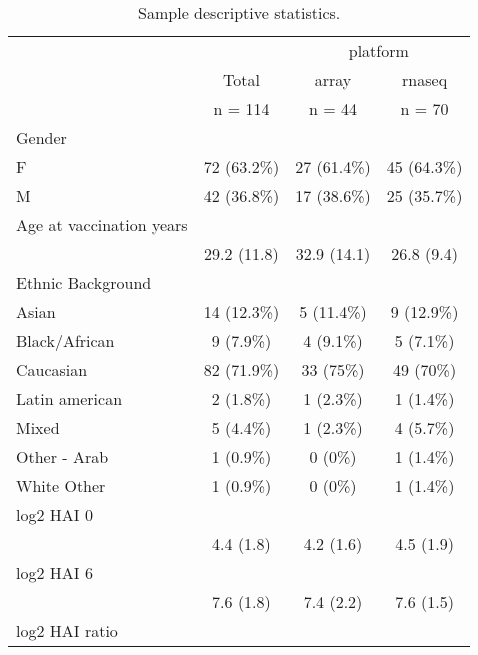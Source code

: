 \begin{table}[ ht ] 
 \centering 
 \caption{Sample descriptive statistics.}\label{tab:hird_table1}
 \begin{tabular}{ l c c c }
 \toprule
  &   &  \multicolumn{ 2 }{c}{ platform }\\ 
   & Total & array & rnaseq \\ 
  & n = 114 & n = 44 & n = 70 \\ 
  \midrule
 Gender &   &   &  \\ 
 \hspace{6pt}    F & 72 (63.2\%) & 27 (61.4\%) & 45 (64.3\%)\\ 
 \hspace{6pt}    M & 42 (36.8\%) & 17 (38.6\%) & 25 (35.7\%)\\ 
 Age at vaccination  years  &   &   &  \\ 
 \hspace{6pt}   & 29.2 (11.8) & 32.9 (14.1) & 26.8 (9.4)\\ 
 Ethnic Background &   &   &  \\ 
 \hspace{6pt}    Asian & 14 (12.3\%) & 5 (11.4\%) & 9 (12.9\%)\\ 
 \hspace{6pt}    Black/African & 9 (7.9\%) & 4 (9.1\%) & 5 (7.1\%)\\ 
 \hspace{6pt}    Caucasian & 82 (71.9\%) & 33 (75\%) & 49 (70\%)\\ 
 \hspace{6pt}    Latin american & 2 (1.8\%) & 1 (2.3\%) & 1 (1.4\%)\\ 
 \hspace{6pt}    Mixed & 5 (4.4\%) & 1 (2.3\%) & 4 (5.7\%)\\ 
 \hspace{6pt}    Other - Arab & 1 (0.9\%) & 0 (0\%) & 1 (1.4\%)\\ 
 \hspace{6pt}    White Other & 1 (0.9\%) & 0 (0\%) & 1 (1.4\%)\\ 
 log2 HAI 0  &   &   &  \\ 
 \hspace{6pt}   & 4.4 (1.8) & 4.2 (1.6) & 4.5 (1.9)\\ 
 log2 HAI 6  &   &   &  \\ 
 \hspace{6pt}   & 7.6 (1.8) & 7.4 (2.2) & 7.6 (1.5)\\ 
 log2 HAI ratio  &   &   &  \\ 

\end{tabular}
\end{table}

